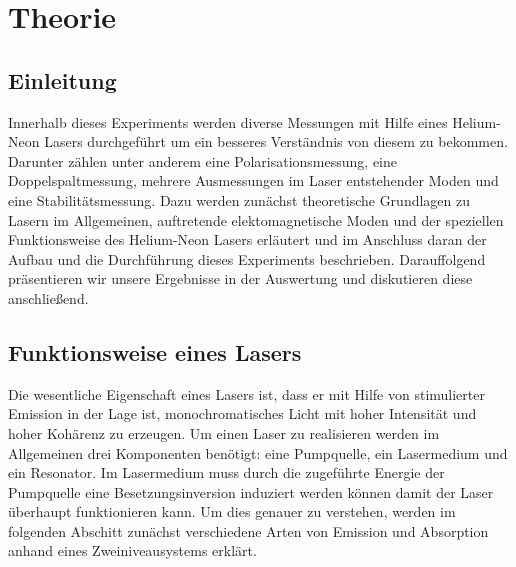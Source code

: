 \section{Theorie}
\label{sec:Theorie}

\subsection{Einleitung}

Innerhalb dieses Experiments werden diverse Messungen mit Hilfe eines Helium-Neon Lasers
durchgeführt um ein besseres Verständnis von diesem zu bekommen. Darunter zählen unter anderem
eine Polarisationsmessung, eine Doppelspaltmessung, mehrere Ausmessungen im Laser entstehender
Moden und eine Stabilitätsmessung.
Dazu werden zunächst theoretische Grundlagen zu Lasern im Allgemeinen, auftretende
elektomagnetische Moden und der speziellen Funktionsweise des Helium-Neon Lasers erläutert
und im Anschluss daran der Aufbau und die Durchführung dieses Experiments beschrieben.
Darauffolgend präsentieren wir unsere Ergebnisse in der Auswertung und diskutieren diese
anschließend.

\subsection{Funktionsweise eines Lasers}

Die wesentliche Eigenschaft eines Lasers ist, dass er mit Hilfe von stimulierter
Emission in der Lage ist, monochromatisches Licht mit hoher Intensität und
hoher Kohärenz zu erzeugen.
Um einen Laser zu realisieren werden im Allgemeinen drei Komponenten benötigt:
eine Pumpquelle, ein Lasermedium und ein Resonator. Im Lasermedium muss durch die zugeführte
Energie der Pumpquelle eine Besetzungsinversion induziert werden können
damit der Laser überhaupt funktionieren kann. Um dies genauer zu verstehen,
werden im folgenden Abschitt zunächst verschiedene Arten von Emission und Absorption
anhand eines Zweiniveausystems erklärt.

